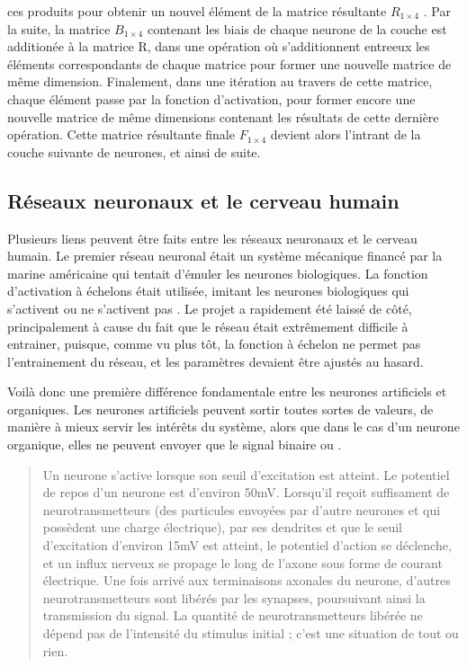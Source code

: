 \documentclass[letterpaper,10pt,french]{sphinxmanual}
\begin{document}
ces produits pour obtenir un nouvel élément de la matrice résultante \(R_{1\times4}\) . Par la suite, la matrice \(B_{1\times4}\)
contenant les biais de chaque neurone
de la couche est additionée à la matrice R, dans une opération où s’additionnent entre\sphinxhyphen{}eux les éléments correspondants de chaque matrice pour
former une nouvelle matrice de même dimension. Finalement, dans une itération au travers de cette matrice, chaque élément passe par la fonction d’activation,
pour former encore une nouvelle matrice de même dimensions contenant les résultats de cette dernière opération. Cette matrice résultante finale \(F_{1\times4}\) devient
alors l’intrant de la couche suivante de neurones, et ainsi de suite.


\subsection{Réseaux neuronaux et le cerveau humain}
\label{\detokenize{notions_de_base:reseaux-neuronaux-et-le-cerveau-humain}}
Plusieurs liens peuvent être faits entre les réseaux neuronaux et le cerveau humain. Le premier réseau neuronal était un
système mécanique financé par la marine américaine qui tentait d’émuler les neurones biologiques. La fonction d’activation
à échelons était utilisée, imitant les neurones biologiques qui s’activent  ou ne s’activent pas . Le projet a rapidement
été laissé de côté, principalement à cause du fait que le réseau était extrêmement difficile à entrainer, puisque, comme vu plus
tôt, la fonction à échelon ne permet pas l’entrainement du réseau, et les paramètres devaient être ajustés au hasard.

Voilà donc une première différence fondamentale entre les neurones artificiels et organiques. Les neurones artificiels peuvent
sortir toutes sortes de valeurs, de manière à mieux servir les intérêts du système, alors que dans le cas d’un neurone organique,
elles ne peuvent envoyer que le signal binaire  ou .
\begin{quote}

Un neurone s’active lorsque son seuil d’excitation est atteint. Le potentiel de repos d’un neurone est d’environ \sphinxhyphen{}50mV. Lorsqu’il
reçoit suffisament de neurotransmetteurs (des particules envoyées par d’autre neurones et qui possèdent une charge électrique), par
ses dendrites et que le seuil d’excitation d’environ 15mV est atteint, le potentiel d’action se déclenche, et un influx nerveux se propage
le long de l’axone sous forme de courant électrique. Une fois arrivé aux terminaisons axonales du neurone, d’autres neurotransmetteurs sont
libérés par les synapses, poursuivant ainsi la transmission du signal. La quantité de neurotransmetteurs libérée ne dépend pas de l’intensité
du stimulus initial ; c’est une situation de tout ou rien. 
\end{quote}
\end{document}
